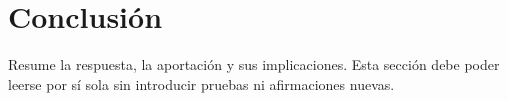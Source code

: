 \section{Conclusión}
Resume la respuesta, la aportación y sus implicaciones. Esta sección debe poder
leerse por sí sola sin introducir pruebas ni afirmaciones nuevas.
